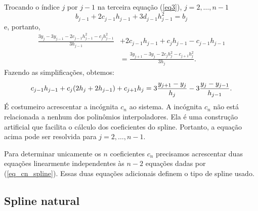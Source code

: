 Trocando o índice $j$ por $j-1$ na terceira equação (\ref{eq3}), $j=2,\ldots, n-1$
\begin{equation}
b_{j-1}+2c_{j-1}h_{j-1}+3d_{j-1}h_{j-1}^2=b_{j}  
\end{equation}
e, portanto,
\begin{equation}
  \begin{split}
    \frac{3y_{j}-3y_{j-1}-2c_{j-1}h_{j-1}^2-c_{j}h_{j-1}^2}{3h_{j-1}} &+ 2c_{j-1}h_{j-1}+c_{j}h_{j-1}-c_{j-1}h_{j-1} \\
    &=\frac{3y_{j+1}-3y_j-2c_jh_j^2-c_{j+1}h_j^2}{3h_j}.      
  \end{split}
\end{equation}
Fazendo as simplificações, obtemos:
\begin{equation}{\label{eq_cn_spline}}
c_{j-1}h_{j-1}+c_j(2h_j+2h_{j-1})+c_{j+1}h_j=3\frac{y_{j+1}-y_j}{h_j}-3\frac{y_{j}-y_{j-1}}{h_{j-1}}.
\end{equation}
É costumeiro acrescentar a incógnita $c_n$ ao sistema. A incógnita $c_n$ não está relacionada a nenhum dos polinômios interpoladores. Ela é uma construção artificial que facilita o cálculo dos coeficientes do spline. Portanto, a equação acima pode ser resolvida para $j=2, \ldots, n-1$.

Para determinar unicamente os $n$ coeficientes $c_n$ precisamos acrescentar duas equações linearmente independentes às $n-2$ equações dadas por (\ref{eq_cn_spline}). Essas duas equações adicionais definem o tipo de spline usado.

\subsection{Spline natural}

